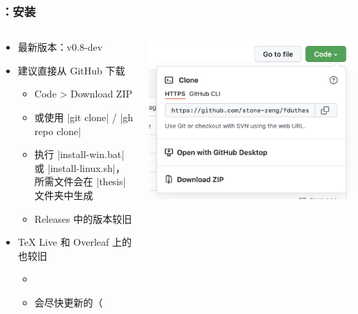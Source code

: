 \begin{frame}[fragile]
\frametitle{：安装}
\begin{columns}
\begin{column}{0.7\textwidth}
  \begin{itemize}
    \item 最新版本：v0.8-dev
    \item 建议直接从 GitHub 下载 

      \begin{itemize}
        \item Code > Download ZIP
        \item 或使用 |git clone| / |gh repo clone|
        \item 执行 |install-win.bat| 或 |install-linux.sh|，所需文件会在 |thesis| 文件夹中生成
        \item Releases 中的版本较旧
      \end{itemize}

    \item \TeX{} Live 和 Overleaf
      上的也较旧

      \begin{itemize}
        \item {}
        \item 会尽快更新的（
      \end{itemize}
  \end{itemize}
\end{column}
\begin{column}{0.26\textwidth}
  \includegraphics[width=\textwidth]{images/github-download.png}
\end{column}
\end{columns}
\end{frame}

